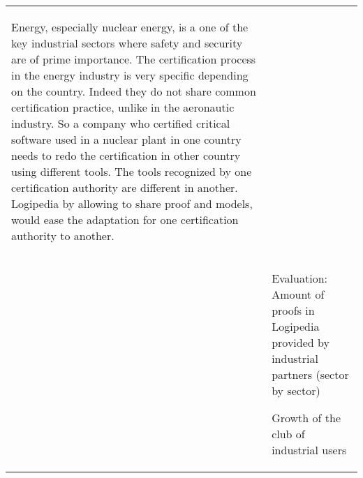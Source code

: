 \begin{longtable}{|p{}|p{}|}
\begin{framed}
Energy, especially nuclear energy, is a one of the key industrial
sectors where safety and security are of prime importance.  The
certification process in the energy industry is very specific
depending on the country. Indeed they do not share common
certification practice, unlike in the aeronautic industry. So a
company who certified critical software used in a nuclear plant in one
country needs to redo the certification in other country using
different tools. The tools recognized by one certification authority
are different in another.  Logipedia by allowing to share proof and
models, would ease the adaptation for one certification authority to
another.
\end{framed}\\

&\begin{framed}
   Evaluation: Amount of proofs in Logipedia provided by
   industrial partners (sector by sector)

   Growth of the club of industrial users

    
   
 \end{framed}\\





\end{longtable}
